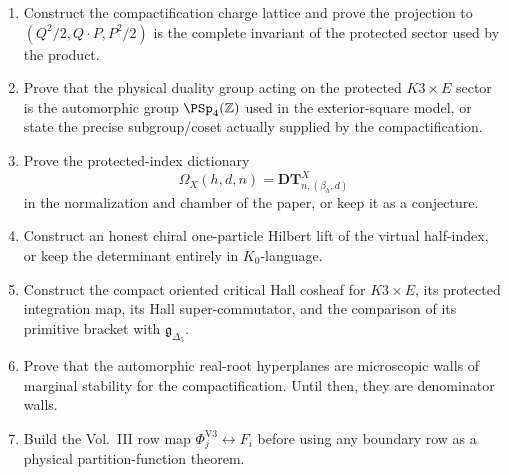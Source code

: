 \begin{enumerate}
\item Construct the compactification charge lattice and prove the
projection to \((Q^2/2,Q\cdot P,P^2/2)\) is the complete invariant of
the protected sector used by the product.

\item Prove that the physical duality group acting on the protected
\(K3\times E\) sector is the automorphic group
\(\PSp_4(\mathbb Z)\) used in the exterior-square model, or state the
precise subgroup/coset actually supplied by the compactification.

\item Prove the protected-index dictionary
$$
\Omega_X(h,d,n)=\mathbf{DT}^X_{n,(\beta_h,d)}
$$
in the normalization and chamber of the paper, or keep it as a
conjecture.

\item Construct an honest chiral one-particle Hilbert lift of the
virtual half-index, or keep the determinant entirely in
\(K_0\)-language.

\item Construct the compact oriented critical Hall cosheaf for
\(K3\times E\), its protected integration map, its Hall
super-commutator, and the comparison of its primitive bracket with
\(\mathfrak g_{\Delta_5}\).

\item Prove that the automorphic real-root hyperplanes are microscopic
walls of marginal stability for the compactification.  Until then, they
are denominator walls.

\item Build the Vol.~III row map
\(\Phi^{\mathrm{V3}}_j\leftrightarrow F_i\) before using any boundary
row as a physical partition-function theorem.
\end{enumerate}
